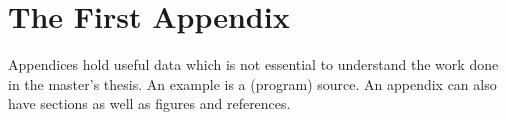 \chapter{The First Appendix}
\label{app:A}
Appendices hold useful data which is not essential to understand the work
done in the master's thesis. An example is a (program) source.
An appendix can also have sections as well as figures and references\cite{h2g2}.

%
%
%
%
%
%

